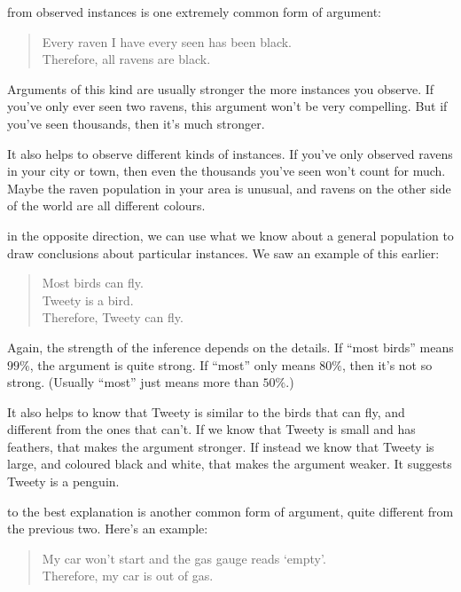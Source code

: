\documentclass[justified]{tufte-book}
\newenvironment{argument}{\begin{quote}\normalsize}{\end{quote}}
\theoremstyle{definition}
\theoremstyle{definition}
\theoremstyle{definition}
\theoremstyle{remark}
\begin{document}
 from observed instances is one extremely
common form of argument:

\begin{argument}
Every raven I have every seen has been black.\\
Therefore, all ravens are black.
\end{argument}

Arguments of this kind are usually stronger the more instances you
observe. If you've only ever seen two ravens, this argument won't be
very compelling. But if you've seen thousands, then it's much stronger.

It also helps to observe different kinds of instances. If you've only
observed ravens in your city or town, then even the thousands you've
seen won't count for much. Maybe the raven population in your area is
unusual, and ravens on the other side of the world are all different
colours.

 in the opposite direction, we can use what we know
about a general population to draw conclusions about particular
instances. We saw an example of this earlier:

\begin{argument}
Most birds can fly.\\
Tweety is a bird.\\
Therefore, Tweety can fly.
\end{argument}

Again, the strength of the inference depends on the details. If ``most
birds'' means \(99\%\), the argument is quite strong. If ``most'' only
means \(80\%\), then it's not so strong. (Usually ``most'' just means
more than \(50\%\).)

It also helps to know that Tweety is similar to the birds that can fly,
and different from the ones that can't. If we know that Tweety is small
and has feathers, that makes the argument stronger. If instead we know
that Tweety is large, and coloured black and white, that makes the
argument weaker. It suggests Tweety is a penguin.

 to the best explanation is another common form of
argument, quite different from the previous two. Here's an example:

\begin{argument}
My car won't start and the gas gauge reads `empty'.\\
Therefore, my car is out of gas.
\end{argument}
\end{document}
